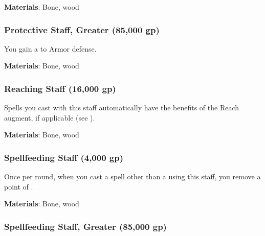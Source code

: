 \vspace{0.25em}
\textbf{Materials}: Bone, wood


\lowercase{\hypertarget{item:Protective Staff, Greater}{}}\label{item:Protective Staff, Greater}
\hypertarget{item:Protective Staff, Greater}{\subsubsection{Protective Staff, Greater\hfill{} (85,000 gp)}}

You gain a   to Armor defense.



\vspace{0.25em}
\textbf{Materials}: Bone, wood


\lowercase{\hypertarget{item:Reaching Staff}{}}\label{item:Reaching Staff}
\hypertarget{item:Reaching Staff}{\subsubsection{Reaching Staff\hfill{} (16,000 gp)}}

Spells you cast with this staff automatically have the benefits of the Reach augment, if applicable (see ).



\vspace{0.25em}
\textbf{Materials}: Bone, wood


\lowercase{\hypertarget{item:Spellfeeding Staff}{}}\label{item:Spellfeeding Staff}
\hypertarget{item:Spellfeeding Staff}{\subsubsection{Spellfeeding Staff\hfill{} (4,000 gp)}}

Once per round, when you cast a spell other than a  using this staff,
you remove a point of .



\vspace{0.25em}
\textbf{Materials}: Bone, wood


\lowercase{\hypertarget{item:Spellfeeding Staff, Greater}{}}\label{item:Spellfeeding Staff, Greater}
\hypertarget{item:Spellfeeding Staff, Greater}{\subsubsection{Spellfeeding Staff, Greater\hfill{} (85,000 gp)}}


